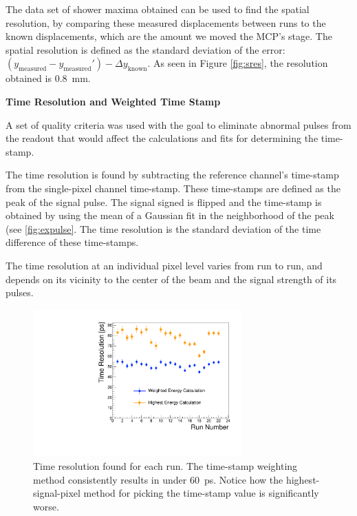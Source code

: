 \documentclass[twocolumn]{article}
\begin{document}
The data set of shower maxima obtained can be used to find the spatial resolution, by comparing these measured displacements between runs to the known displacements, which are the amount we moved the MCP's stage. The spatial resolution is defined as the standard deviation of the error: $(y_\text{measured}-y_\text{measured}') - \Delta y_\text{known}$. As seen in Figure \ref{fig:sres}, the resolution obtained is \SI{0.8}{\milli\meter}.



\title{\large}{\textbf{Time Resolution and Weighted Time Stamp}}

A set of quality criteria was used with the goal to eliminate abnormal pulses from the readout that would affect the calculations and fits for determining the time-stamp.

The time resolution is found by subtracting the reference channel's time-stamp from the single-pixel channel time-stamp. These time-stamps are defined as the peak of the signal pulse. The signal signed is flipped and the time-stamp is obtained by using the mean of a Gaussian fit in the neighborhood of the peak (see \ref{fig:expulse}. The time resolution is the standard deviation of the time difference of these time-stamps.

The time resolution at an individual pixel level varies from run to run, and depends on its vicinity to the center of the beam and the signal strength of its pulses.

\begin{figure}[htbp]
	\centering
	\includegraphics[width=8cm]{Images/wtres/tresperrun.pdf}
	\caption{\small Time resolution found for each run. The time-stamp weighting method consistently results in under \SI{60}{\pico\second}. Notice how the highest-signal-pixel method for picking the time-stamp value is significantly worse.}
	\label{fig:wtres}
\end{figure}
\end{document}
